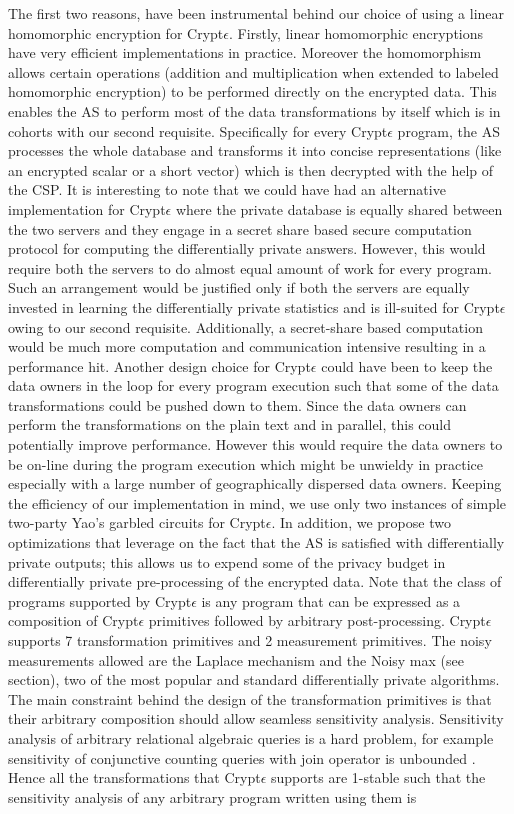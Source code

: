 The first two reasons, have been instrumental behind our choice of using a linear homomorphic encryption for Crypt$\epsilon$. Firstly, linear homomorphic encryptions have very efficient implementations in practice. Moreover the homomorphism allows certain operations (addition and multiplication when extended to labeled homomorphic encryption) to be performed directly on the encrypted data. This enables the \textsf{AS} to perform most of the data transformations by itself which is in cohorts with our second requisite. Specifically for every Crypt$\epsilon$ program, the \textsf{AS} processes the whole database and transforms it into concise representations (like an encrypted scalar or a short vector) which is then decrypted with the help of the \textsf{CSP}. It is interesting to note that we could have had an alternative implementation for Crypt$\epsilon$ where the private database is equally shared between the two servers and they engage in a secret share based secure computation protocol for computing the differentially private answers. However, this would require both the servers to do almost equal amount of work for every program. Such an arrangement would be justified only if both the servers are equally invested in learning the differentially private statistics and is ill-suited for Crypt$\epsilon$ owing to our second requisite. Additionally, a secret-share based computation would be much more computation and communication intensive resulting in a performance hit. Another design choice for Crypt$\epsilon$ could have been to keep the data owners in the loop for every program execution such that some of the data transformations could be pushed down to them. Since the data owners can perform the transformations on the plain text and in parallel, this could potentially improve performance. However this would require the data owners to be on-line during the program execution which might be unwieldy in practice especially with a large number of geographically dispersed data owners.  Keeping the efficiency of our implementation in mind, we use only two instances of simple two-party Yao's garbled circuits for Crypt$\epsilon$. In addition, we propose two optimizations that leverage on the fact that the AS is satisfied with differentially private outputs; this allows  us to expend some of the privacy budget in differentially private pre-processing of the encrypted data. Note that the class of programs supported by Crypt$\epsilon$ is any program that can be expressed as a composition of  Crypt$\epsilon$ primitives followed by arbitrary post-processing. Crypt$\epsilon$ supports 7 transformation primitives and 2 measurement primitives. The noisy measurements allowed are the Laplace mechanism and the Noisy max (see section), two of the most popular and standard differentially private algorithms. The main constraint behind the design of the transformation primitives is that their arbitrary composition should allow seamless sensitivity analysis.  Sensitivity analysis of arbitrary relational algebraic queries is a hard problem, for example sensitivity of conjunctive counting queries with join operator is unbounded \cite{sensitivity}. Hence all the transformations that Crypt$\epsilon$ supports are 1-stable such that the sensitivity analysis of any arbitrary program written using them is 